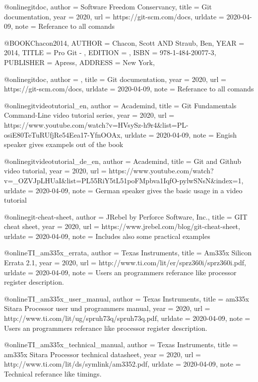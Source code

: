 



@online{gitdoc,
author = {Software Freedom Conservancy},
title = {Git documentation},
year = 2020,
url = {https://git-scm.com/docs},
urldate = {2020-04-09},
note = {Referance to all comands}
}



@BOOK{Chacon2014,
	AUTHOR = {Chacon, Scott AND Straub, Ben},
	YEAR = {2014},
	TITLE = {Pro Git - },
	EDITION = {},
	ISBN = {978-1-484-20077-3},
	PUBLISHER = {Apress},
	ADDRESS = {New York},
}


@online{gitdoc,
author = {},
title = {Git documentation},
year = 2020,
url = {https://git-scm.com/docs},
urldate = {2020-04-09},
note = {Referance to all comands}
}

@online{gitvideotutorial_en,
author = {Academind},
title = {Git Fundamentals Command-Line video tutorial series},
year = 2020,
url = {https://www.youtube.com/watch?v=HVsySz-h9r4&list=PL-osiE80TeTuRUfjRe54Eea17-YfnOOAx},
urldate = {2020-04-09},
note = {Engish speaker gives exampels out of the book \cite{Chacon2014}}
}


@online{gitvideotutorial_de_en,
author = {Academind},
title = {Git and Github video tutorial},
year = 2020,
url = {https://www.youtube.com/watch?v=_OZVJpLHUaI&list=PL55RiY5tL51poFMpbva1IqfO-pylwSNsN&index=1},
urldate = {2020-04-09},
note = {German speaker gives the basic usage in a video tutorial}
}


@online{git-cheat-sheet,
author = {JRebel by Perforce Software, Inc.},
title = {GIT cheat sheet},
year = 2020,
url = {https://www.jrebel.com/blog/git-cheat-sheet},
urldate = {2020-04-09},
note = {Includes also some practical examples}
}


@online{TI_am335x_errata,
author = {Texas Instruments},
title = {Am335x Silicon Errata 2.1},
year = 2020,
url = {http://www.ti.com/lit/er/sprz360i/sprz360i.pdf},
urldate = {2020-04-09},
note = {Users an programmers referance like processor register description.}
}

@online{TI_am335x_user_manual,
author = {Texas Instruments},
title = {am335x Sitara Processor user und programmers manual},
year = 2020,
url = {http://www.ti.com/lit/ug/spruh73q/spruh73q.pdf},
urldate = {2020-04-09},
note = {Users an programmers referance like processor register description.}
}


@online{TI_am335x_technical_manual,
author = {Texas Instruments},
title = {am335x Sitara Processor technical datasheet},
year = 2020,
url = {http://www.ti.com/lit/ds/symlink/am3352.pdf},
urldate = {2020-04-09},
note = {Technical referance like timings.}
}




